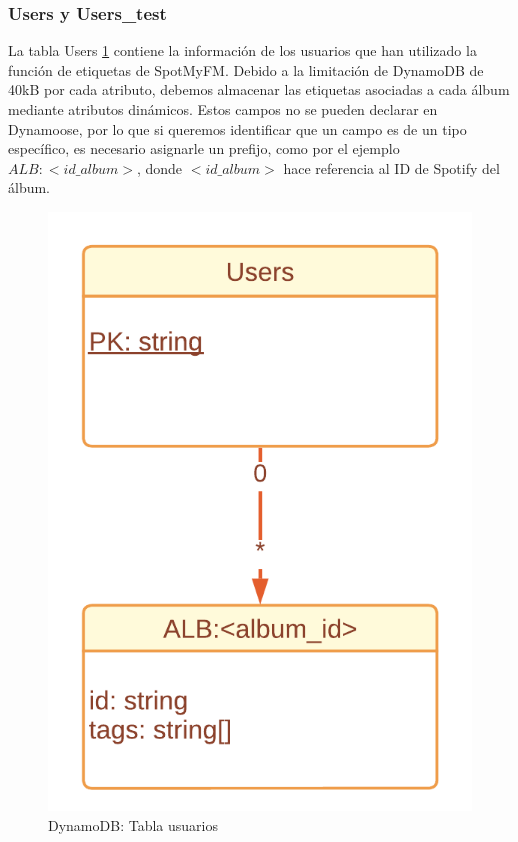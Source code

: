 \subsubsection{Users y Users\_test}
La tabla Users \ref{fig:C:dynamo_users} contiene la información de los usuarios que han utilizado la función de etiquetas de SpotMyFM. Debido a la limitación de DynamoDB de 40kB por cada atributo, debemos almacenar las etiquetas asociadas a cada álbum mediante atributos dinámicos. Estos campos no se pueden declarar en Dynamoose, por lo que si queremos identificar que un campo es de un tipo específico, es necesario asignarle un prefijo, como por el ejemplo $ALB:<id\_album>$, donde $<id\_album>$ hace referencia al ID de Spotify del álbum.
\begin{figure}[]
    \centering
    \includegraphics{img/C/data_users.png}
    \caption{DynamoDB: Tabla usuarios}
    \label{fig:C:dynamo_users}
\end{figure}

